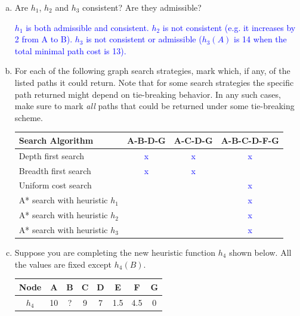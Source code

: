 \documentclass[a4paper]{article}
\begin{document}
\begin{enumerate}[(a)]
\item Are $h_1$, $h_2$ and $h_3$ consistent? Are they admissible? 

\textcolor{blue}{$h_1$ is both admissible and consistent. $h_2$ is not consistent (e.g. it increases by 2 from A to B). $h_3$ is not consistent or admissible ($h_3(A)$ is 14 when the total minimal path cost is 13).}


\item For each of the following graph search strategies, mark which, if any, of the
listed paths it could return.   Note that for some search strategies
the specific path returned might depend on tie-breaking behavior.   In any such cases, make sure to mark
\emph{all} paths that could be returned under some tie-breaking scheme.

\vspace{.1in}
\begin{table}[!h]
\centering
\begin{tabular}{|l|c|c|c|}
\hline
Search Algorithm &  \textbf{A-B-D-G} & \textbf{A-C-D-G} &
\textbf{A-B-C-D-F-G} \\
\hline
Depth first search & \textcolor{blue}{x} & \textcolor{blue}{x} & \textcolor{blue}{x} \\
\hline
Breadth first search & \textcolor{blue}{x}&\textcolor{blue}{x} & \\
\hline
Uniform cost search & & & \textcolor{blue}{x} \\
\hline
A* search with heuristic $h_1$ & & & \textcolor{blue}{x} \\
\hline
A* search with heuristic $h_2$ & & & \textcolor{blue}{x} \\
\hline
A* search with heuristic $h_3$ & & & \textcolor{blue}{x} \\
\hline
\end{tabular}
\end{table}

\item Suppose you are completing the new heuristic function $h_4$ shown below.
All the values are fixed except $h_4(B)$. 

\begin{center}
\begin{tabular}{|c|c|c|c|c|c|c|c|}
\hline
Node & A & B & C & D & E & F & G \\
\hline
$h_4$& 10 & ?  & 9 & 7 & 1.5 & 4.5& 0 \\
\hline
\end{tabular}
\end{center}


\end{enumerate}
\end{document}
